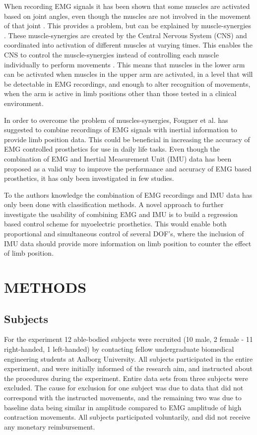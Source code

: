 \begin{multicols}{2}
When recording EMG signals it has been shown that some muscles are activated based on joint angles, even though the muscles are not involved in the movement of that joint \cite{Fougner2011}. This provides a problem, but can be explained by muscle-synergies \cite{DeRugy2013}. These muscle-synergies are created by the Central Nervous System (CNS) and coordinated into activation of different muscles at varying times. This enables the CNS to control the muscle-synergies instead of controlling each muscle individually to perform movements \cite{jiang2009}. This means that muscles in the lower arm can be activated when muscles in the upper arm are activated, in a level that will be detectable in EMG recordings, and enough to alter recognition of movements, when the arm is active in limb positions other than those tested in a clinical environment. 

In order to overcome the problem of muscles-synergies, Fougner et al. \cite{Fougner2011} has suggested to combine recordings of EMG signals with inertial information to provide limb position data. This could be beneficial in increasing the accuracy of EMG controlled prosthetics for use in daily life tasks. 
Even though the combination of EMG and Inertial Measurement Unit (IMU) data has been proposed as a valid way to improve the performance and accuracy of EMG based prosthetics, it has only been investigated in few studies. \cite{Roy2010, Imtiaz2014, jiang2012}

To the authors knowledge the combination of EMG recordings and IMU data has only been done with classification methods. A novel approach to further investigate the usability of combining EMG and IMU is to build a regression based control scheme for myoelectric prosthetics. This would enable both proportional and simultaneous control of several DOF's, where the inclusion of IMU data should provide more information on limb position to counter the effect of limb position.		
	
\section{METHODS}%
	
%		
\subsection{Subjects}
For the experiment 12 able-bodied subjects were recruited (10 male, 2 female - 11 right-handed, 1 left-handed) by contacting fellow undergraduate biomedical engineering students at Aalborg University. All subjects participated in the entire experiment, and were initially informed of the research aim, and instructed about the procedures during the experiment. Entire data sets from three subjects were excluded. The cause for exclusion for one subject was due to data that did not correspond with the instructed movements, and the remaining two was due to baseline data being similar in amplitude compared to EMG amplitude of high contraction movements. All subjects participated voluntarily, and did not receive any monetary reimbursement. 


\end{multicols}
